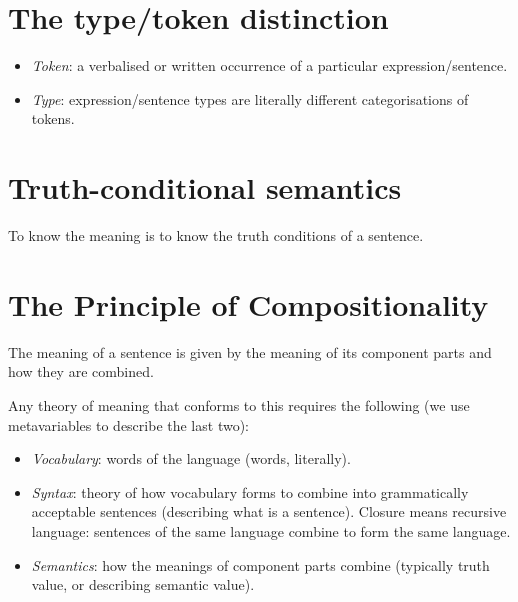 \section{The type/token distinction}

\begin{definition}\leavevmode
\begin{itemize}
  \item \emph{Token}: a verbalised or written occurrence of a particular expression/sentence.
  \item \emph{Type}: expression/sentence types are literally different categorisations of tokens.
\end{itemize}
\end{definition}

\section{Truth-conditional semantics}

\begin{definition}
To know the meaning is to know the truth conditions of a sentence.
\end{definition}

\section{The Principle of Compositionality}

\begin{definition}
The meaning of a sentence is given by the meaning of its component parts and how they are combined.
\end{definition}

Any theory of meaning that conforms to this requires the following (we use metavariables to describe the last two):
\begin{itemize}
  \item \emph{Vocabulary}: words of the language (words, literally).
  \item \emph{Syntax}: theory of how vocabulary forms to combine into grammatically acceptable sentences (describing what is a sentence). Closure means recursive language: sentences of the same language combine to form the same language.
  \item \emph{Semantics}: how the meanings of component parts combine (typically truth value, or describing semantic value).
\end{itemize}
